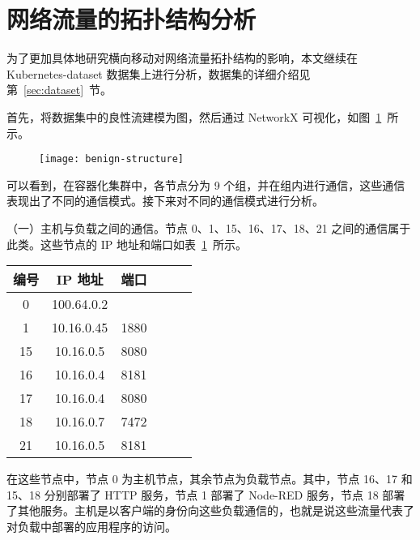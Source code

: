 {\section{网络流量的拓扑结构分析}
\label{sec:topology}

为了更加具体地研究横向移动对网络流量拓扑结构的影响，本文继续在 Kubernetes-dataset 数据集上进行分析，数据集的详细介绍见第~\ref{sec:dataset}~节。

首先，将数据集中的良性流建模为图，然后通过 NetworkX\citep{networkx} 可视化，如图~\ref{fig:benign-structure}~所示。

\begin{figure}[t]
    \centering
    \texttt{[image: benign-structure]}
    \label{fig:benign-structure}

\end{figure}

可以看到，在容器化集群中，各节点分为 9 个组，并在组内进行通信，这些通信表现出了不同的通信模式。接下来对不同的通信模式进行分析。

（一）主机与负载之间的通信。节点 0、1、15、16、17、18、21 之间的通信属于此类。这些节点的 IP 地址和端口如表~\ref{tab:benign-structure-1}~所示。

\begin{table}[!htbp]
    \label{tab:benign-structure-1}
    \centering
    \footnotesize%
    \setlength{\tabcolsep}{4pt}%
    \renewcommand{\arraystretch}{1.2}%
    \begin{tabular}{cccccc}
        \hline
        编号 & IP 地址 & 端口\\
        \hline
        0 & 100.64.0.2 & \geq 32768\\
        1 & 10.16.0.45 & 1880\\
        15 & 10.16.0.5 & 8080\\
        16 & 10.16.0.4 & 8181\\
        17 & 10.16.0.4 & 8080\\
        18 & 10.16.0.7 & 7472\\
        21 & 10.16.0.5 & 8181\\
        \hline
    \end{tabular}
\end{table}

在这些节点中，节点 0 为主机节点，其余节点为负载节点。其中，节点 16、17 和 15、18 分别部署了 HTTP 服务，节点 1 部署了 Node-RED 服务，节点 18 部署了其他服务。主机是以客户端的身份向这些负载通信的，也就是说这些流量代表了对负载中部署的应用程序的访问。

}
